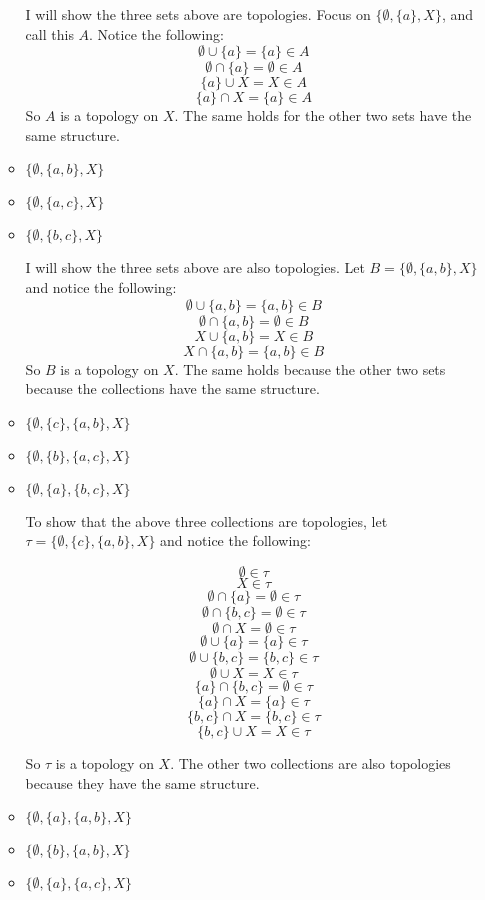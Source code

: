 \documentclass[12pt]{article}
\begin{document}
\begin{enumerate}
\begin{itemize}
    I will show the three sets above are topologies. Focus on $\{\emptyset, \{a\},X\}$, and call this $A$. Notice the following:
    \[\emptyset \cup \{a\} = \{a\} \in A\]
    \[\emptyset \cap \{a\} = \emptyset \in A\]
    \[\{a\} \cup X = X \in A\]
    \[\{a\} \cap X = \{a\} \in A\]
    So $A$ is a topology on $X$. The same holds for the other two sets have the same structure.
    
    \item $\{\emptyset, \{a, b\}, X\}$ 
    \item $\{\emptyset, \{a, c\}, X\}$ 
    \item $\{\emptyset, \{b, c\}, X\}$  
    
    I will show the three sets above are also topologies. Let $B = \{\emptyset, \{a, b\}, X\}$ and notice the following:
    \[\emptyset \cup \{a,b\} = \{a, b\} \in B\]
    \[\emptyset \cap \{a,b\} = \emptyset \in B\]
    \[X \cup \{a,b\} = X \in B\]
    \[X \cap \{a,b\} = \{a,b\} \in B\]
    So $B$ is a topology on $X$. The same holds because the other two sets because the collections have the same structure.
    
    
    \item $\{\emptyset, \{c\}, \{a, b\}, X\}$
    \item $\{\emptyset, \{b\}, \{a, c\}, X\}$
    \item $\{\emptyset, \{a\}, \{b, c\}, X\}$
    
    To show that the above three collections are topologies, let $\tau = \{\emptyset, \{c\}, \{a,b\},X\}$ and notice the following:
    
    \[\emptyset \in \tau\]
    \[X \in \tau\]
    \[\emptyset \cap \{a\} = \emptyset \in \tau\]
    \[\emptyset \cap \{b,c\} = \emptyset \in \tau\]
    \[\emptyset \cap X = \emptyset \in \tau\]
    \[\emptyset \cup \{a\} = \{a\} \in \tau\]
    \[\emptyset \cup \{b,c\} = \{b,c\} \in \tau\]
    \[\emptyset \cup X = X \in \tau\]
    \[\{a\} \cap \{b,c\} = \emptyset \in \tau\]
    \[\{a\} \cap X = \{a\} \in \tau\]
    \[\{b,c\} \cap X = \{b,c\} \in \tau\]
    \[\{b,c\} \cup X = X \in \tau\]
    
    So $\tau$ is a topology on $X$. The other two collections are also topologies because they have the same structure.
    
    \item $\{\emptyset, \{a\}, \{a, b\}, X\}$
    \item $\{\emptyset, \{b\}, \{a, b\}, X\}$
    
    \item $\{\emptyset, \{a\}, \{a, c\}, X\}$
    

\end{itemize}
\end{enumerate}
\end{document}
